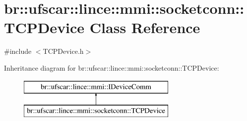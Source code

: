 \hypertarget{classbr_1_1ufscar_1_1lince_1_1mmi_1_1socketconn_1_1TCPDevice}{
\section{br::ufscar::lince::mmi::socketconn::TCPDevice Class Reference}
\label{classbr_1_1ufscar_1_1lince_1_1mmi_1_1socketconn_1_1TCPDevice}
}


{\ttfamily \#include $<$TCPDevice.h$>$}

Inheritance diagram for br::ufscar::lince::mmi::socketconn::TCPDevice:\begin{figure}[H]
\begin{center}
\leavevmode
\includegraphics[height=2cm]{classbr_1_1ufscar_1_1lince_1_1mmi_1_1socketconn_1_1TCPDevice}
\end{center}
\end{figure}
